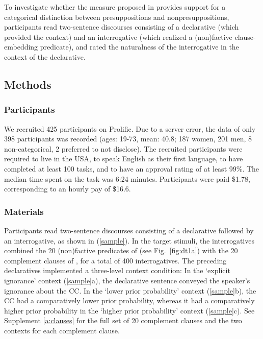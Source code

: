 \documentclass[11pt,fleqn]{article}
\newcommand{\6}{\mbox{$[\hspace*{-.6mm}[$}}
\newcommand{\9}{\mbox{$]\hspace*{-.6mm}]$}}
\begin{document}
To investigate whether the measure proposed in \citealt{mandelkern-etal2020} provides support for a categorical distinction between presuppositions and nonpresuppositions, participants read two-sentence discourses consisting of a declarative (which provided the context) and an interrogative (which realized a (non)factive clause-embedding predicate), and rated the naturalness of the interrogative in the context of the declarative.

\subsection{Methods}\label{s-methods}

\subsubsection{Participants}

We recruited 425 participants on Prolific. Due to a server error, the data of only 398 participants was recorded (ages: 19-73, mean: 40.8; 187 women, 201 men, 8 non-categorical, 2 preferred to not disclose). The recruited participants were required to live in the USA, to speak English as their first language, to have completed at least 100 tasks, and to have an approval rating of at least 99\%. The median time spent on the task was 6:24 minutes. Participants were paid \$1.78, corresponding to an hourly pay of \$16.6.


\subsubsection{Materials}

Participants read two-sentence discourses consisting of a declarative followed by an interrogative, as shown in (\ref{sample}). In the target stimuli, the interrogatives combined the 20 (non)factive predicates of \citealt{degen-tonhauser-language} (see Fig.~\ref{fig:dt1a}) with the 20 complement clauses of \citealt{degen-tonhauser-language}, for a total of 400 interrogatives. The preceding declaratives implemented a three-level context condition: In the `explicit ignorance' context (\ref{sample}a), the declarative sentence conveyed the speaker's ignorance about the CC. In the `lower prior probability' context (\ref{sample}b), the CC had a comparatively lower prior probability, whereas it had a comparatively higher prior probability in the `higher prior probability' context (\ref{sample}c). See Supplement \ref{a:clauses} for the full set of 20 complement clauses and the two contexts for each complement clause.
\end{document}
